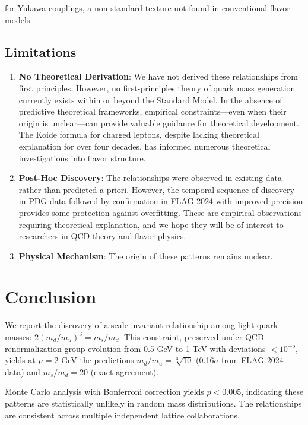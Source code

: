 \documentclass[12pt]{article}
\begin{document}
for Yukawa couplings, a non-standard texture not found in conventional flavor models.

\subsection{Limitations}

\begin{enumerate}
\item \textbf{No Theoretical Derivation}: We have not derived these relationships from first principles. However, no first-principles theory of quark mass generation currently exists within or beyond the Standard Model. In the absence of predictive theoretical frameworks, empirical constraints—even when their origin is unclear—can provide valuable guidance for theoretical development. The Koide formula for charged leptons, despite lacking theoretical explanation for over four decades, has informed numerous theoretical investigations into flavor structure.

\item \textbf{Post-Hoc Discovery}: The relationships were observed in existing data rather than predicted a priori. However, the temporal sequence of discovery in PDG data followed by confirmation in FLAG 2024 with improved precision provides some protection against overfitting. These are empirical observations requiring theoretical explanation, and we hope they will be of interest to researchers in QCD theory and flavor physics.

\item \textbf{Physical Mechanism}: The origin of these patterns remains unclear.
\end{enumerate}

\section{Conclusion}

We report the discovery of a scale-invariant relationship among light quark masses: $2(m_d/m_u)^3 = m_s/m_d$. This constraint, preserved under QCD renormalization group evolution from 0.5 GeV to 1 TeV with deviations $<10^{-5}$, yields at $\mu=2$ GeV the predictions $m_d/m_u = \sqrt[3]{10}$ (0.16$\sigma$ from FLAG 2024 data) and $m_s/m_d = 20$ (exact agreement).

Monte Carlo analysis with Bonferroni correction yields $p < 0.005$, indicating these patterns are statistically unlikely in random mass distributions. The relationships are consistent across multiple independent lattice collaborations.
\end{document}
